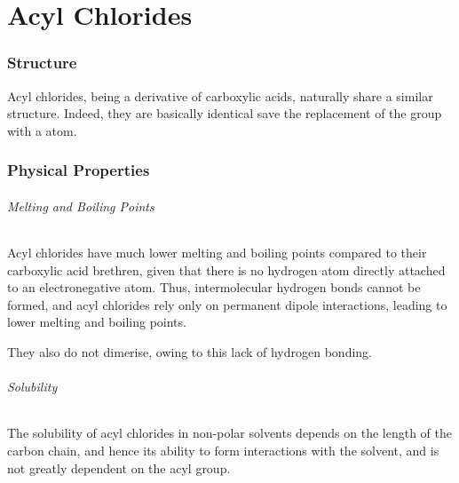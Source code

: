 

\pagebreak
\hypertarget{ChapterAcylChlorides}{}
\part{Acyl Chlorides}

	\section{Structure}

		Acyl chlorides, being a derivative of carboxylic acids, naturally share a similar structure. Indeed, they are basically identical
		save the replacement of the  group with a \ch{\Cl} atom.





	\section{Physical Properties}

		\paragraph{Melting and Boiling Points}

		Acyl chlorides have much lower melting and boiling points compared to their carboxylic acid brethren, given that there is no hydrogen
		atom directly attached to an electronegative atom. Thus, intermolecular hydrogen bonds cannot be formed, and acyl chlorides rely only
		on permanent dipole interactions, leading to lower melting and boiling points.

		They also do not dimerise, owing to this lack of hydrogen bonding.


		\paragraph{Solubility}

		The solubility of acyl chlorides in non-polar solvents depends on the length of the carbon chain, and hence its ability to form
		\idid{} interactions with the solvent, and is not greatly dependent on the acyl group.

